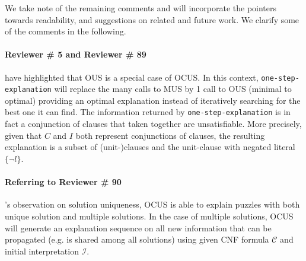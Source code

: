 \documentclass{article}
\begin{document}
\vspace{2em}
\noindent We take note of the remaining comments and will incorporate the pointers towards readability, and suggestions on related and future work. We clarify some of the comments in the following. 


\paragraph{Reviewer \# 5 and Reviewer \# 89} have highlighted that OUS is a special case of OCUS. In this context, \texttt{one-step-explanation} will replace the many calls to MUS by 1 call to OUS (minimal to optimal) providing an optimal explanation instead of iteratively searching for the best one it can find. 
The information returned by \texttt{one-step-explanation} is in fact a conjunction of clauses that taken together are unsatisfiable. More precisely, given that $C$ and $I$ both represent conjunctions of clauses, the resulting explanation is a subset of (unit-)clauses and the unit-clause with negated literal $\{\lnot l \}$.

\paragraph{Referring to Reviewer \# 90}'s observation on solution uniqueness, OCUS is able to explain puzzles with both unique solution and multiple solutions. In the case of multiple solutions, OCUS will generate an explanation sequence on all new information that can be propagated (e.g. is shared among all solutions) using given CNF formula $\mathcal{C}$ and initial interpretation $\mathcal{I}$.
\end{document}
